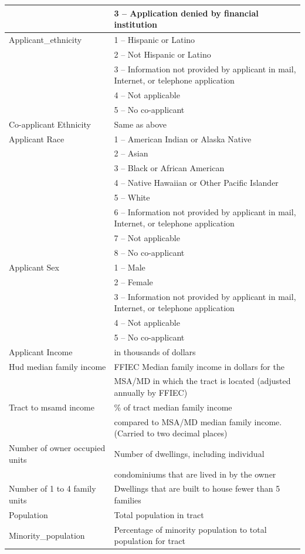 \documentclass{jpp}
\begin{document}
\begin{center}
\begin{longtable}{|p{3cm}|p{10cm}|}
  & 3 -- Application denied by financial institution \\ 
  \hline
  Applicant\_ethnicity & 1 -- Hispanic or Latino \\ 
  & 2 -- Not Hispanic or Latino \\ 
  & 3 -- Information not provided by applicant in mail, Internet, or telephone application \\ 
  & 4 -- Not applicable \\ 
  & 5 -- No co-applicant \\
  \hline
  Co-applicant Ethnicity & Same as above \\ 
  \hline
  Applicant Race & 1 -- American Indian or Alaska Native \\ 
  & 2 -- Asian \\ 
  & 3 -- Black or African American\\ 
  & 4 -- Native Hawaiian or Other Pacific Islander\\ 
  & 5 -- White\\ 
  & 6 -- Information not provided by applicant in mail, Internet, or telephone application\\ 
  & 7 -- Not applicable \\ 
  & 8 -- No co-applicant \\ 
  \hline
  Applicant Sex & 1 -- Male \\ 
  & 2 -- Female \\ 
  & 3 -- Information not provided by applicant in mail, Internet, or telephone application \\ 
  & 4 -- Not applicable \\ 
  &5 -- No co-applicant \\ 
  \hline
  Applicant Income & in thousands of dollars \\ 
  \hline
  Hud median family income & FFIEC Median family income in dollars for the\\ 
  & MSA/MD in which the tract is located (adjusted annually by FFIEC) \\ 
  \hline
  Tract to msamd income & \% of tract median family income\\ 
  & compared to MSA/MD median family income. (Carried to two decimal places) \\ 
  \hline
  Number of owner occupied units & Number of dwellings, including individual\\ 
  & condominiums that are lived in by the owner \\ 
  \hline
  Number of 1 to 4 family units & Dwellings that are built to house fewer than 5 families \\ 
  \hline
  Population & Total population in tract \\ 
  \hline
  Minority\_population & Percentage of minority population to total population for tract\\
  \hline
\end{longtable}
\end{center}
\end{document}
